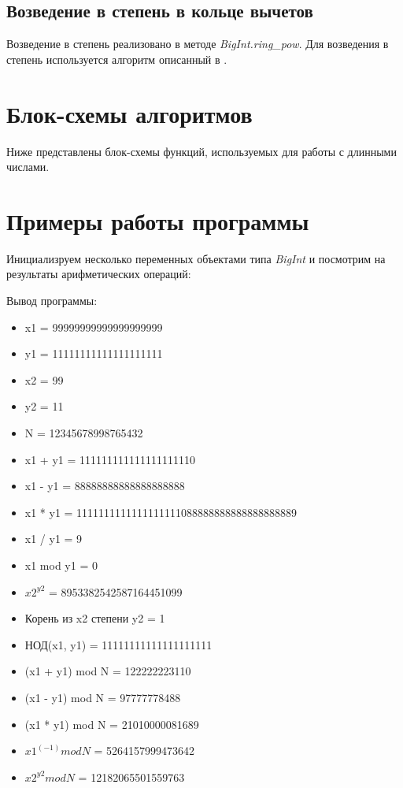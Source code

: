 \subsection{Возведение в степень в кольце вычетов}
Возведение в степень реализовано в методе \textit{BigInt.ring\_pow}. Для возведения в степень используется алгоритм описанный в \cite{zavg}.

\section{Блок-схемы алгоритмов}
Ниже представлены блок-схемы функций, используемых для работы с длинными числами.





\clearpage

\section{Примеры работы программы}

Инициализруем несколько переменных объектами типа \textit{BigInt} и посмотрим на результаты арифметических операций:



Вывод программы:
\begin{itemize}
    \item x1 = 99999999999999999999
    \item y1 = 11111111111111111111
    \item x2 = 99
    \item y2 = 11
    \item N = 12345678998765432
    \item x1 + y1 = 111111111111111111110
    \item x1 - y1 = 88888888888888888888
    \item x1 * y1 = 1111111111111111111088888888888888888889
    \item x1 / y1 = 9
    \item x1 mod y1 = 0
    \item $x2 ^{y2}$ = 8953382542587164451099
    \item Корень из x2 степени y2 = 1
    \item НОД(x1, y1) = 11111111111111111111
    \item (x1 + y1) mod N = 122222223110
    \item (x1 - y1) mod N = 97777778488
    \item (x1 * y1) mod N = 21010000081689
    \item $x1 ^{(-1)} mod N$ = 5264157999473642
    \item $x2 ^{y2} mod N$ = 12182065501559763
\end{itemize}

